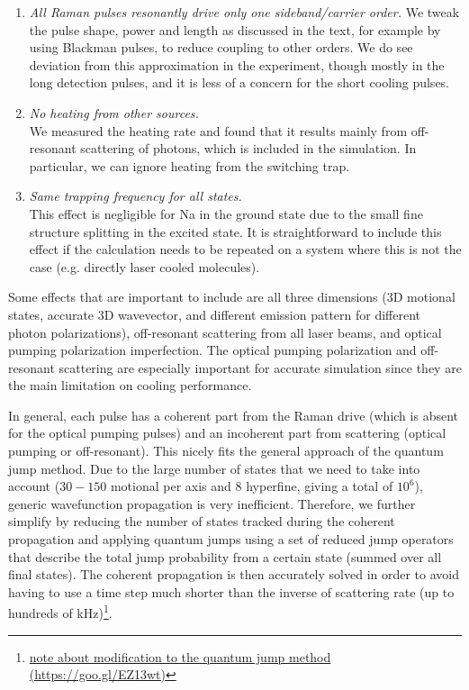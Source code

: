 \documentclass[aps,twocolumn,secnumarabic,amsmath,amssymb]{revtex4}
\begin{document}
\begin{enumerate}
\item \emph{All Raman pulses resonantly drive only one sideband/carrier order.}  We tweak the pulse shape, power and length as discussed in the text, for example by using Blackman pulses, to reduce coupling to other orders. We do see deviation from this approximation in the experiment, though mostly in the long detection pulses, and it is less of a concern for the short cooling pulses.
\item \emph{No heating from other sources.}\\
  We measured the heating rate and found that it results mainly from off-resonant scattering
  of photons, which is included in the simulation.  In particular, we can ignore heating from the switching trap.
\item \emph{Same trapping frequency for all states.}\\
  This effect is negligible for Na in the ground state due to the small fine structure splitting in the excited state.
  It is straightforward to include this effect if the calculation needs to be repeated
  on a system where this is not the case (e.g. directly laser cooled molecules).
\end{enumerate}

Some effects that are important to include are all three dimensions (3D motional states,
accurate 3D wavevector, and different emission pattern for different photon polarizations),
off-resonant scattering from all laser beams, and optical pumping polarization imperfection.
The optical pumping polarization and off-resonant scattering are especially important
for accurate simulation since they are the main limitation on cooling performance.

In general, each pulse has a coherent part from the Raman drive
(which is absent for the optical pumping pulses)
and an incoherent part from scattering (optical pumping or off-resonant).
This nicely fits the general approach of the quantum jump method.
Due to the large number of states that we need to take into account
($30-150$ motional per axis and $8$ hyperfine, giving a total of $10^6$),
generic wavefunction propagation is very inefficient.
Therefore, we further simplify by reducing the number of states tracked during
the coherent propagation and applying quantum jumps using a set of reduced jump operators that
describe the total jump probability from a certain state (summed over all final states).
The coherent propagation is then accurately solved in order to avoid having to use a time step
much shorter than the inverse of scattering rate (up to hundreds of kHz)\footnote{\href{https://goo.gl/EZ13wt}{note about modification to the quantum jump method (https://goo.gl/EZ13wt)}}.
\end{document}
